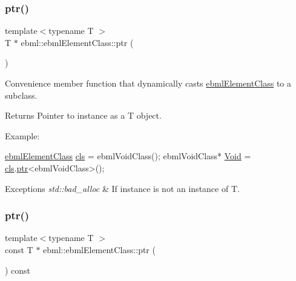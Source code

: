 \subsubsection{\texorpdfstring{ptr()}{ptr()}\hspace{0.1cm}{\footnotesize\ttfamily [1/2]}}
{\footnotesize\ttfamily template$<$typename T $>$ \\
T $\ast$ ebml\+::ebml\+Element\+Class\+::ptr (\begin{DoxyParamCaption}{ }\end{DoxyParamCaption})}

Convenience member function that dynamically casts \mbox{\hyperlink{classebml_1_1ebmlElementClass}{ebml\+Element\+Class}} to a subclass.

\begin{DoxyReturn}{Returns}
Pointer to instance as a T object.
\end{DoxyReturn}
Example\+: 
\begin{DoxyCode}
\mbox{\hyperlink{classebml_1_1ebmlElementClass_a6c2081870c5d66c70e0cf988ff253420}{ebmlElementClass}} \mbox{\hyperlink{classebml_1_1ebmlElement_a15cf59e94b01e2c49ec96512b9bd9d90}{cls}} = ebmlVoidClass();
ebmlVoidClass* \mbox{\hyperlink{namespaceebml_afbfd509d1cb71e416a07253746e886e9}{Void}} = \mbox{\hyperlink{classebml_1_1ebmlElement_a15cf59e94b01e2c49ec96512b9bd9d90}{cls}}.\mbox{\hyperlink{classebml_1_1ebmlElementClass_af6901ccaf31aa832687777a0c225abd2}{ptr}}<ebmlVoidClass>();
\end{DoxyCode}
 
\begin{DoxyExceptions}{Exceptions}
{\em std\+::bad\+\_\+alloc} & If instance is not an instance of T. \\
\hline
\end{DoxyExceptions}
\mbox{\label{classebml_1_1ebmlElementClass_ad41af01c63a43d4a629483a2076dcb4e}} 
\subsubsection{\texorpdfstring{ptr()}{ptr()}\hspace{0.1cm}{\footnotesize\ttfamily [2/2]}}
{\footnotesize\ttfamily template$<$typename T $>$ \\
const T $\ast$ ebml\+::ebml\+Element\+Class\+::ptr (\begin{DoxyParamCaption}{ }\end{DoxyParamCaption}) const}

